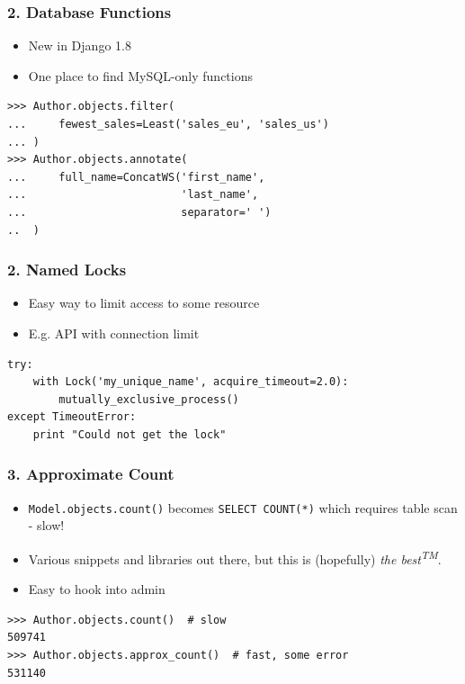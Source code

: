 \documentclass{beamer}
\begin{document}
\begin{frame}[fragile]\frametitle{2. Database Functions}

    \begin{itemize}
        \item New in Django 1.8
        \item One place to find MySQL-only functions
    \end{itemize}


    \begin{lstlisting}
>>> Author.objects.filter(
...     fewest_sales=Least('sales_eu', 'sales_us')
... )
>>> Author.objects.annotate(
...     full_name=ConcatWS('first_name',
...                        'last_name',
...                        separator=' ')
..  )
    \end{lstlisting}

\end{frame}


\begin{frame}[fragile]\frametitle{2. Named Locks}

    \begin{itemize}
        \item Easy way to limit access to some resource
        \item E.g. API with connection limit
    \end{itemize}


    \begin{lstlisting}
try:
    with Lock('my_unique_name', acquire_timeout=2.0):
        mutually_exclusive_process()
except TimeoutError:
    print "Could not get the lock"
    \end{lstlisting}

\end{frame}


\begin{frame}[fragile]\frametitle{3. Approximate Count}

    \begin{itemize}
        \item \texttt{Model.objects.count()} becomes \texttt{SELECT COUNT(*)}
              which requires table scan - slow!
        \item Various snippets and libraries out there, but this is (hopefully)
              \textit{the best\textsuperscript{TM}}.
        \item Easy to hook into admin
    \end{itemize}


    \begin{lstlisting}
>>> Author.objects.count()  # slow
509741
>>> Author.objects.approx_count()  # fast, some error
531140
    \end{lstlisting}

\end{frame}
\end{document}
